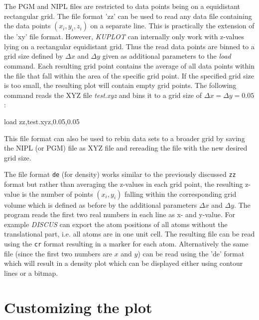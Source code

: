 The PGM and NIPL files are restricted to data points being on a
equidistant rectangular grid. The file format 'zz' can be used to
read any data file containing the data points $(x_{i}, y_{i},
z_{i})$ on a separate line. This is practically the extension of the
'xy' file format. However, {\it KUPLOT} can internally only work
with z-values lying on a rectangular equidistant grid. Thus the read
data points are binned to a grid size defined by $\Delta x$ and
$\Delta y$ given as additional parameters to the {\it load} command.
Each resulting grid point contains the average of all data points
within the file that fall within the area of the specific grid
point. If the specified grid size is too small, the resulting plot
will contain empty grid points. The following command reads the XYZ
file {\it test.xyz} and bins it to a grid size of $\Delta x = \Delta
y = 0.05$:

\begin{MacVerbatim}
    load zz,test.xyz,0.05,0.05
\end{MacVerbatim}

This file format can also be used to rebin data sets to a broader grid
by saving the NIPL (or PGM) file as XYZ file and rereading the file
with the new desired grid size. \par

The file format {\tt de} (for density) works similar to the
previously discussed {\tt zz} format but rather than averaging the
z-values in each grid point, the resulting z-value is the number of
points $(x_{i}, y_{i})$ falling within the corresponding grid volume
which is defined as before by the additional parameters $\Delta x$
and $\Delta y$. The program reads the first two real numbers in each
line as x- and y-value. For example {\it DISCUS} can export the atom
positions of all atoms without the translational part, i.e. all
atoms are in one unit cell. The resulting file can be read using the
{\tt cr} format resulting in a marker for each atom. Alternatively
the same file (since the first two numbers are $x$ and $y$) can be
read using the 'de' format which will result in a density plot which
can be displayed either using contour lines or a bitmap.


\section{Customizing the plot \label{2d-change}}

